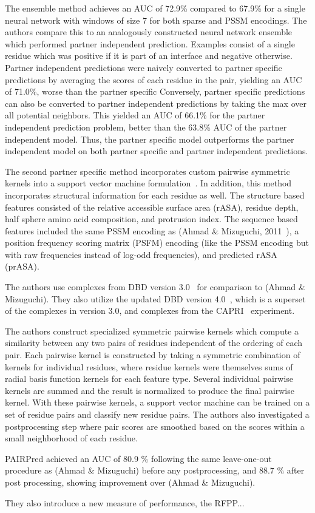 The ensemble method achieves an AUC of 72.9\% compared to 67.9\% for a single neural network with windows of size 7 for both sparse and PSSM encodings.
The authors compare this to an analogously constructed neural network ensemble which performed partner independent prediction.
Examples consist of a single residue which was positive if it is part of an interface and negative otherwise.
Partner independent predictions were naively converted to partner specific predictions by averaging the scores of each residue in the pair, yielding an AUC of 71.0\%, worse than the partner specific 
Conversely, partner specific predictions can also be converted to partner independent predictions by taking the max over all potential neighbors. 
This yielded an AUC of 66.1\% for the partner independent prediction problem, better than the 63.8\% AUC of the partner independent model.
Thus, the partner specific model outperforms the partner independent model on both partner specific and partner independent predictions.

The second partner specific method incorporates custom pairwise symmetric kernels into a support vector machine formulation~\cite{minhas2014}.
In addition, this method incorporates structural information for each residue as well.
The structure based features consisted of the relative accessible surface area (rASA), residue depth, half sphere amino acid composition, and protrusion index.
The sequence based features included the same PSSM encoding as (Ahmad \& Mizuguchi, 2011~\cite{ahmad2011}), a position frequency scoring matrix (PSFM) encoding (like the PSSM encoding but with raw frequencies instead of log-odd frequencies), and predicted rASA (prASA).

The authors use complexes from DBD version 3.0~\cite{hwang2008} for comparison to (Ahmad \& Mizuguchi).
They also utilize the updated DBD version 4.0~\cite{hwang2010}, which is a superset of the complexes in version 3.0, and complexes from the CAPRI~\cite{janin2013} experiment.

The authors construct specialized symmetric pairwise kernels which compute a similarity between any two pairs of residues independent of the ordering of each pair.
Each pairwise kernel is constructed by taking a symmetric combination of kernels for individual residues, where residue kernels were themselves sums of radial basis function kernels for each feature type.
Several individual pairwise kernels are summed and the result is normalized to produce the final pairwise kernel.
With these pairwise kernels, a support vector machine can be trained on a set of residue pairs and classify new residue pairs.
The authors also investigated a postprocessing step where pair scores are smoothed based on the scores within a small neighborhood of each residue.

PAIRPred achieved an AUC of 80.9 \% following the same leave-one-out procedure as (Ahmad \& Mizuguchi) before any postprocessing, and 88.7 \% after post processing, showing improvement over (Ahmad \& Mizuguchi).

They also introduce a new measure of performance, the RFPP...